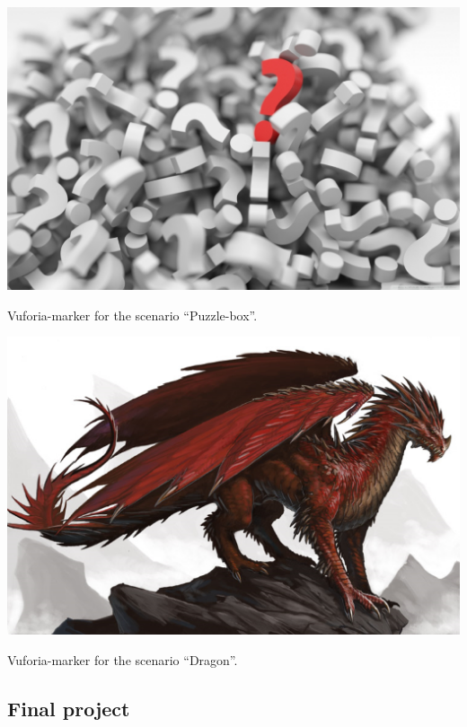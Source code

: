 \documentclass{sigchi-ext}
\begin{document}
\begin{marginfigure}[-20pc]
	\centering
	\begin{minipage}{\marginparwidth}
		\centering
		\includegraphics[width=1\marginparwidth]{figures/Vuforia_Questionmarks}
		\caption{Vuforia-marker for the scenario ``Puzzle-box''.}\label{fig:Vuforia_Questionmarks}
	\end{minipage}
	\begin{minipage}{\marginparwidth}
		\centering
		\includegraphics[width=1\marginparwidth]{figures/Vuforia_Dragon}
		\caption{Vuforia-marker for the scenario ``Dragon''.}\label{fig:Vuforia_Dragon}
	\end{minipage}
\end{marginfigure}

\subsection{Final project}
\end{document}
